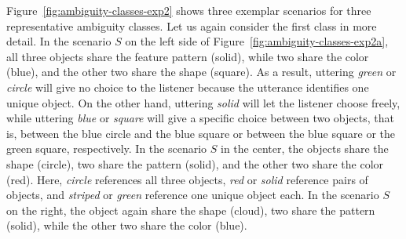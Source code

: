 \documentclass[11pt,a4paper]{article}
\begin{document}
Figure~\ref{fig:ambiguity-classes-exp2} shows three exemplar scenarios for three representative  ambiguity classes. 
Let us again consider the first class in more detail.
In the scenario $S$ on the left side of Figure~\ref{fig:ambiguity-classes-exp2a}, 
all three objects share the feature pattern (solid), while two share the color (blue), and the other two share the shape (square).
As a result, uttering \textit{green} or \textit{circle} will give no choice to the listener because the utterance identifies one unique object. 
On the other hand, uttering \textit{solid} will let the listener choose freely, while uttering \textit{blue} or \textit{square} will give a specific choice between two objects, that is, between the blue circle and the blue square or between the blue square or the green square, respectively.
In the scenario $S$ in the center, the objects share the shape (circle), two share the pattern (solid), and the other two share the color (red).
Here, \textit{circle} references all three objects, \textit{red} or \textit{solid} reference pairs of objects, and \textit{striped} or \textit{green} reference one unique object each.
In the scenario $S$ on the right, the object again share the shape (cloud), two share the pattern (solid), while the other two share the color (blue).
\end{document}
